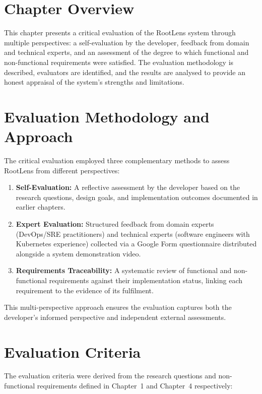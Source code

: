 
\section{Chapter Overview}
This chapter presents a critical evaluation of the RootLens system through multiple perspectives: a self-evaluation by the developer, feedback from domain and technical experts, and an assessment of the degree to which functional and non-functional requirements were satisfied. The evaluation methodology is described, evaluators are identified, and the results are analysed to provide an honest appraisal of the system's strengths and limitations.

\section{Evaluation Methodology and Approach}
The critical evaluation employed three complementary methods to assess RootLens from different perspectives:

\begin{enumerate}
    \item \textbf{Self-Evaluation:} A reflective assessment by the developer based on the research questions, design goals, and implementation outcomes documented in earlier chapters.
    \item \textbf{Expert Evaluation:} Structured feedback from domain experts (DevOps/SRE practitioners) and technical experts (software engineers with Kubernetes experience) collected via a Google Form questionnaire distributed alongside a system demonstration video.
    \item \textbf{Requirements Traceability:} A systematic review of functional and non-functional requirements against their implementation status, linking each requirement to the evidence of its fulfilment.
\end{enumerate}

This multi-perspective approach ensures the evaluation captures both the developer's informed perspective and independent external assessments.

\section{Evaluation Criteria}
The evaluation criteria were derived from the research questions and non-functional requirements defined in Chapter~1 and Chapter~4 respectively:

